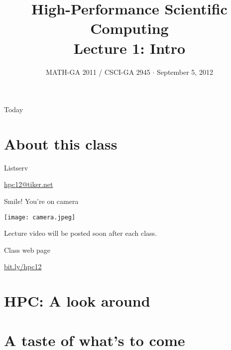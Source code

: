 \documentclass[english,compress]{beamer}
\begin{document}

\title{High-Performance Scientific Computing\\Lecture 1: Intro}

\date{MATH-GA 2011 / CSCI-GA 2945 $\cdot$ September 5, 2012}

\frame{
  \titlepage
}



\begin{frame}{Today}
  \tableofcontents[hideallsubsections]
\end{frame}
\section{About this class}
\begin{frame}{Listserv}
  \begin{center}
    \Huge
    \href{mailto:hpc12@tiker.net}{hpc12@tiker.net}
  \end{center}
\end{frame}
\begin{frame}{Smile! You're on camera}
  \begin{center}
    \texttt{[image: camera.jpeg]}

    Lecture video will be posted soon after each class.
  \end{center}
\end{frame}
\begin{frame}{Class web page}
  \begin{center}
    \Huge
    \href{http://bit.ly/hpc12}{bit.ly/hpc12}
  \end{center}
\end{frame}
\section{HPC: A look around}
\section{A taste of what's to come}

\questionframe{}
\imagecreditslide
\end{document}
